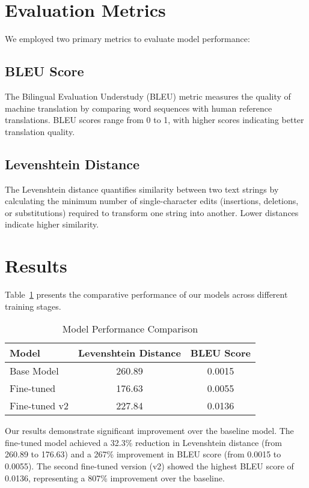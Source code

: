 \documentclass[conference]{IEEEtran}
\begin{document}
\section{Evaluation Metrics}

We employed two primary metrics to evaluate model performance:

\subsection{BLEU Score}
The Bilingual Evaluation Understudy (BLEU) metric measures the quality of machine translation by comparing word sequences with human reference translations. BLEU scores range from 0 to 1, with higher scores indicating better translation quality.

\subsection{Levenshtein Distance}
The Levenshtein distance quantifies similarity between two text strings by calculating the minimum number of single-character edits (insertions, deletions, or substitutions) required to transform one string into another. Lower distances indicate higher similarity.

\section{Results}

Table~\ref{tab:results} presents the comparative performance of our models across different training stages.

\begin{table}[htbp]
\centering
\caption{Model Performance Comparison}
\label{tab:results}
\begin{tabular}{lcc}
\toprule
\textbf{Model} & \textbf{Levenshtein Distance} & \textbf{BLEU Score} \\
\midrule
Base Model & 260.89 & 0.0015 \\
Fine-tuned & 176.63 & 0.0055 \\
Fine-tuned v2 & 227.84 & 0.0136 \\
\bottomrule
\end{tabular}
\end{table}

Our results demonstrate significant improvement over the baseline model. The fine-tuned model achieved a 32.3\% reduction in Levenshtein distance (from 260.89 to 176.63) and a 267\% improvement in BLEU score (from 0.0015 to 0.0055). The second fine-tuned version (v2) showed the highest BLEU score of 0.0136, representing a 807\% improvement over the baseline.
\end{document}
